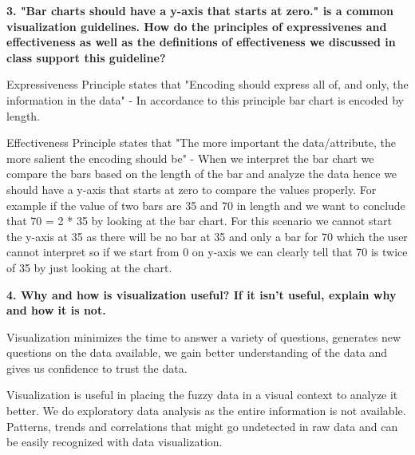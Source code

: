 \documentclass{article}[12pt]
\begin{document}
\vspace{2ex}\noindent
{\bf 3. "Bar charts should have a y-axis that starts at zero." is a common visualization guidelines. How do the principles of expressivenes and effectiveness as well as the definitions of effectiveness we discussed in class support this guideline?}

{ 
    Expressiveness Principle states that "Encoding should express all of, and only, the information in the data" - In accordance to this principle bar chart is encoded by length.
    
    Effectiveness Principle states that "The more important the data/attribute, the more salient the encoding should be" - When we interpret the bar chart we compare the bars based on the length of the bar and analyze the data hence we should have a y-axis that starts at zero to compare the values properly. For example if the value of two bars are 35 and 70 in length and we want to conclude that 70 = 2 * 35 by looking at the bar chart. For this scenario we cannot start the y-axis at 35 as there will be no bar at 35 and only a bar for 70 which the user cannot interpret so if we start from 0 on y-axis we can clearly tell that 70 is twice of 35 by just looking at the chart. 

}




\vspace{2ex}\noindent
{ \bf 4. Why and how is visualization useful? If it isn't useful, explain why and how it is not. }

{
	Visualization minimizes the time to answer a variety of questions, generates new questions on the data available, we gain better understanding of the data and gives us confidence to trust the data.

	Visualization is useful in placing the fuzzy data in a visual context to analyze it better. We do exploratory data analysis as the entire information is not available. Patterns, trends and correlations that might go undetected in raw data and can be easily recognized with data visualization. 	 

}
\end{document}
